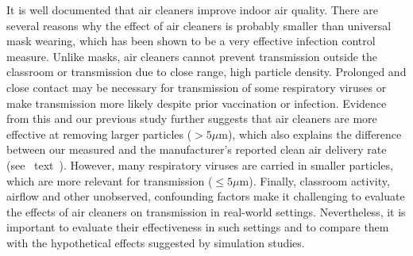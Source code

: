 \documentclass[fleqn,11pt]{wlscirep}
\begin{document}
It is well documented that air cleaners improve indoor air quality\cite{Park2020Build,Buising2022InfContr,Banholzer2023PLoSMed}. There are several reasons why the effect of air cleaners is probably smaller than universal mask wearing, which has been shown to be a very effective infection control measure\cite{Banholzer2023PLoSMed,Heinsohn2022,Gettings2021,Leung2020NatMed,Milton2013PLoSPathogens}. Unlike masks, air cleaners cannot prevent transmission outside the classroom or transmission due to close range, high particle density. Prolonged and close contact may be necessary for transmission of some respiratory viruses\cite{Leung2020NatMed,Brankston2007LancetID} or make transmission more likely despite prior vaccination or infection\cite{Lind2023NatCommun}. Evidence from this and our previous study\cite{Banholzer2023PLoSMed} further suggests that air cleaners are more effective at removing larger particles ($>5\mu$m), which also explains the difference between our measured and the manufacturer's reported clean air delivery rate (see \supp~text~). However, many respiratory viruses are carried in smaller particles, which are more relevant for transmission ($\leq5\mu$m)\cite{Fennelly2020}. Finally, classroom activity, airflow and other unobserved, confounding factors make it challenging to evaluate the effects of air cleaners on transmission in real-world settings. Nevertheless, it is important to evaluate their effectiveness in such settings and to compare them with the hypothetical effects suggested by simulation studies\cite{Lindsley2021,Cortellessa2023Build}.


\end{document}
